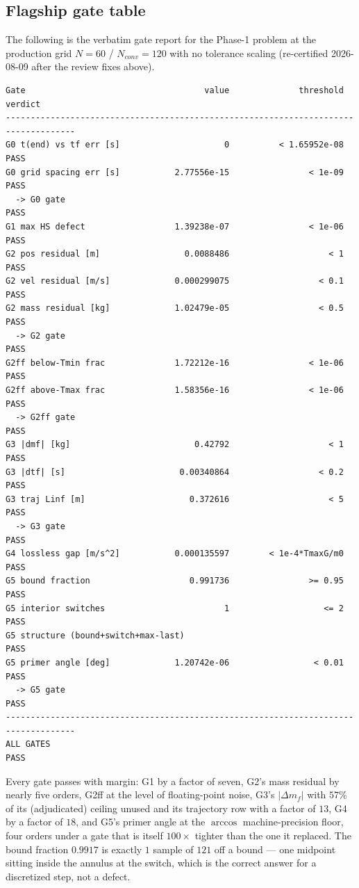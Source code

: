 \documentclass[11pt]{article}
\begin{document}
\subsection{Flagship gate table}

The following is the verbatim gate report for the Phase-1 problem at the
production grid $N = 60$ / $N_{conv} = 120$ with no tolerance scaling
(re-certified 2026-08-09 after the review fixes above).

{\footnotesize
\begin{verbatim}
Gate                                    value              threshold   verdict
------------------------------------------------------------------------------------
G0 t(end) vs tf err [s]                     0          < 1.65952e-08   PASS
G0 grid spacing err [s]           2.77556e-15                < 1e-09   PASS
  -> G0 gate                                                           PASS
G1 max HS defect                  1.39238e-07                < 1e-06   PASS
G2 pos residual [m]                 0.0088486                    < 1   PASS
G2 vel residual [m/s]             0.000299075                  < 0.1   PASS
G2 mass residual [kg]             1.02479e-05                  < 0.5   PASS
  -> G2 gate                                                           PASS
G2ff below-Tmin frac              1.72212e-16                < 1e-06   PASS
G2ff above-Tmax frac              1.58356e-16                < 1e-06   PASS
  -> G2ff gate                                                         PASS
G3 |dmf| [kg]                         0.42792                    < 1   PASS
G3 |dtf| [s]                       0.00340864                  < 0.2   PASS
G3 traj Linf [m]                     0.372616                    < 5   PASS
  -> G3 gate                                                           PASS
G4 lossless gap [m/s^2]           0.000135597        < 1e-4*TmaxG/m0   PASS
G5 bound fraction                    0.991736                >= 0.95   PASS
G5 interior switches                        1                   <= 2   PASS
G5 structure (bound+switch+max-last)                                         PASS
G5 primer angle [deg]             1.20742e-06                 < 0.01   PASS
  -> G5 gate                                                           PASS
------------------------------------------------------------------------------------
ALL GATES                                                              PASS
\end{verbatim}
}

Every gate passes with margin: G1 by a factor of seven, G2's mass residual
by nearly five orders, G2ff at the level of floating-point noise, G3's
$|\Delta m_f|$ with $57\%$ of its (adjudicated) ceiling unused and its
trajectory row with a factor of $13$, G4 by a factor of $18$, and G5's
primer angle at the $\arccos$ machine-precision floor, four orders under a
gate that is itself $100\times$ tighter than the one it replaced. The bound
fraction $0.9917$ is exactly $1$ sample of $121$ off a bound --- one
midpoint sitting inside the annulus at the switch, which is the correct
answer for a discretized step, not a defect.
\end{document}
